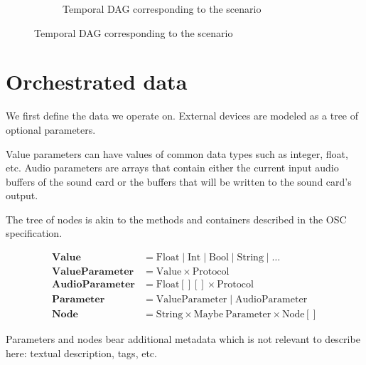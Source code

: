 \documentclass{article}
\DeclareMathOperator{\tc}{TC}
\begin{document}
\begin{figure}
\begin{subfigure}[t!]{0.45\textwidth}
        
        \caption{Temporal DAG corresponding to the scenario}
    \end{subfigure}
\end{figure}

\section{Orchestrated data}\label{sec.device}
We first define the data we operate on.
External devices are modeled as a tree of optional parameters.

Value parameters can have values of common data types such as integer, float, etc.
Audio parameters are arrays that contain either the current input audio buffers of the sound card or the buffers that will be written to the sound card's output.

The tree of nodes is akin to the methods and containers described in the OSC specification.

\begin{align*}
\mathbf{Value} & = \mathrm{Float} \mid \mathrm{Int} \mid \mathrm{Bool} \mid \mathrm{String} \mid \dots \\
\mathbf{ValueParameter} & = \mathrm{Value} \times \mathrm{Protocol} \\
\mathbf{AudioParameter} & = \mathrm{Float[][]} \times \mathrm{Protocol} \\
\mathbf{Parameter} & = \mathrm{ValueParameter} \mid \mathrm{AudioParameter} \\
\mathbf{Node} & = \mathrm{String} \times \mathrm{Maybe}~\mathrm{Parameter} \times \mathrm{Node[]} 
\end{align*}

Parameters and nodes bear additional metadata which is not relevant to describe here: textual description, tags, etc.
\end{document}

